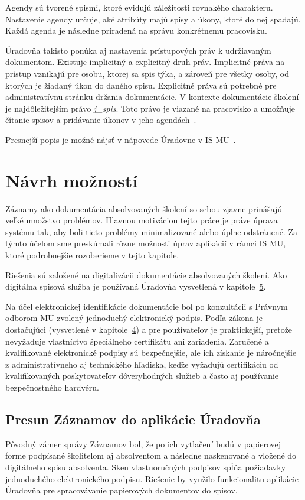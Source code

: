 \documentclass[
  digital,     %
  oneside,     %
  nosansbold,  %
  nocolorbold, %
  lof,         %
  nolot,         %
]{fithesis4}
\begin{document}
Agendy sú tvorené spismi, ktoré evidujú záležitosti rovnakého charakteru. Nastavenie agendy určuje, aké atribúty majú spisy a úkony, ktoré do nej spadajú. Každá agenda je následne priradená na správu konkrétnemu pracovisku.~\cite{uradovna2024}

Úradovňa takisto ponúka aj nastavenia prístupových práv k udržiavaným dokumentom. Existuje implicitný a explicitný druh práv. Implicitné práva na prístup vznikajú pre osobu, ktorej sa spis týka, a zároveň pre všetky osoby, od ktorých je žiadaný úkon do daného spisu. Explicitné práva sú potrebné pre administratívnu stránku držania dokumentácie. V kontexte dokumentácie školení je najdôležitejším právo \textit{j\_spis}. Toto právo je viazané na pracovisko a umožňuje čítanie spisov a pridávanie úkonov v jeho agendách~\cite{uradovna2024}.

Presnejší popis je možné nájsť v nápovede Úradovne v IS MU~\cite{uradovna2024}.

\chapter{Návrh možností}
\label{kap-6}
Záznamy ako dokumentácia absolvovaných školení so sebou zjavne prinášajú veľké množstvo problémov. Hlavnou motiváciou tejto práce je práve úprava systému tak, aby boli tieto problémy minimalizované alebo úplne odstránené. Za týmto účelom sme preskúmali rôzne možnosti úprav aplikácií v rámci IS MU, ktoré podrobnejšie rozoberieme v tejto kapitole.

Riešenia sú založené na digitalizácii dokumentácie absolvovaných školení. Ako digitálna spisová služba je používaná Úradovňa vysvetlená v kapitole~\hyperref[kap-5]{5}.

Na účel elektronickej identifikácie dokumentácie bol po konzultácii s Právnym odborom MU zvolený jednoduchý elektronický podpis. Podľa zákona je dostačujúci (vysvetlené v kapitole~\hyperref[kap-4]{4}) a pre používateľov je praktickejší, pretože nevyžaduje vlastníctvo špeciálneho certifikátu ani zariadenia. Zaručené a kvalifikované elektronické podpisy sú bezpečnejšie, ale ich získanie je náročnejšie z administratívneho aj technického hľadiska, keďže vyžadujú certifikáciu od kvalifikovaných poskytovateľov dôveryhodných služieb a často aj používanie bezpečnostného hardvéru.

\section{Presun Záznamov do aplikácie Úradovňa}
Pôvodný zámer správy Záznamov bol, že po ich vytlačení budú v papierovej forme podpísané školiteľom aj absolventom a následne naskenované a vložené do digitálneho spisu absolventa. Sken vlastnoručných podpisov spĺňa požiadavky jednoduchého elektronického podpisu. Riešenie by využilo funkcionalitu aplikácie Úradovňa pre spracovávanie papierových dokumentov do spisov. 
\end{document}
